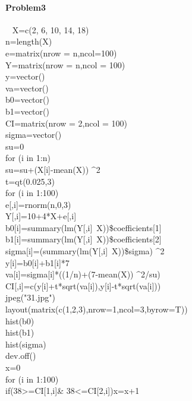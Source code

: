 \documentclass{article}
\begin{document}
\paragraph{Problem3}~{}
\newline
X=c(2, 6, 10, 14, 18)\\
n=length(X)\\
e=matrix(nrow = n,ncol=100)\\
Y=matrix(nrow = n,ncol = 100)\\
y=vector()\\
va=vector()\\
b0=vector()\\
b1=vector()\\
CI=matrix(nrow = 2,ncol = 100)\\
sigma=vector()\\
su=0\\
for (i in 1:n) {\\
  su=su+(X[i]-mean(X)) $\^$2}\\
t=qt(0.025,3)\\
for (i in 1:100) {\\
e[,i]=rnorm(n,0,3)\\
Y[,i]=10+4*X+e[,i]\\
b0[i]=summary(lm(Y[,i]~X))\$coefficients[1]
b1[i]=summary(lm(Y[,i]~X))\$coefficients[2]\\
sigma[i]=(summary(lm(Y[,i]~X))\$sigma) $\^$2\\
y[i]=b0[i]+b1[i]*7\\
va[i]=sigma[i]*((1/n)+(7-mean(X)) $\^$2/su)\\
CI[,i]=c(y[i]+t*sqrt(va[i]),y[i]-t*sqrt(va[i]))}\\
jpeg("31.jpg")\\
layout(matrix(c(1,2,3),nrow=1,ncol=3,byrow=T))\\
hist(b0)\\
hist(b1)\\
hist(sigma)\\
dev.off()\\
x=0\\
for (i in 1:100) {\\
  if(38>=CI[1,i]\& 38<=CI[2,i]){x=x+1}}
\end{document}
